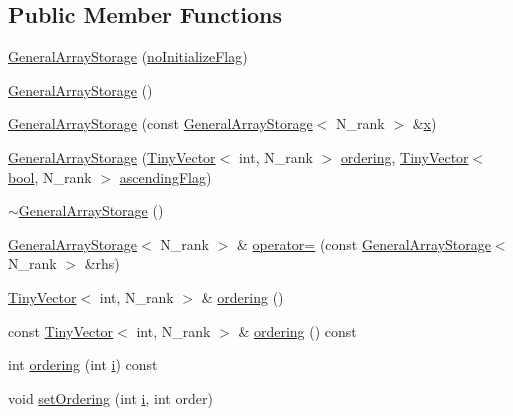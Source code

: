 \subsection*{Public Member Functions}
\begin{DoxyCompactItemize}
\item 
\hyperlink{classGeneralArrayStorage_ab02ffa50b97e3165e7accf59f1a40467}{General\+Array\+Storage} (\hyperlink{classGeneralArrayStorage_1_1noInitializeFlag}{no\+Initialize\+Flag})
\item 
\hyperlink{classGeneralArrayStorage_ad408f67d08d435c28089888711cf041b}{General\+Array\+Storage} ()
\item 
\hyperlink{classGeneralArrayStorage_a88e38a9f0858a5a22fbd696f4d643296}{General\+Array\+Storage} (const \hyperlink{classGeneralArrayStorage}{General\+Array\+Storage}$<$ N\+\_\+rank $>$ \&\hyperlink{vecnorm1_8cc_ac73eed9e41ec09d58f112f06c2d6cb63}{x})
\item 
\hyperlink{classGeneralArrayStorage_a8df71aed8a480968b90901e4c497d689}{General\+Array\+Storage} (\hyperlink{classTinyVector}{Tiny\+Vector}$<$ int, N\+\_\+rank $>$ \hyperlink{classGeneralArrayStorage_a09cd9534a9e0a2b1f6a5c5796b1c1489}{ordering}, \hyperlink{classTinyVector}{Tiny\+Vector}$<$ \hyperlink{compiler_8h_abb452686968e48b67397da5f97445f5b}{bool}, N\+\_\+rank $>$ \hyperlink{classGeneralArrayStorage_affa1b4235352c211cbbdb10c56e81b20}{ascending\+Flag})
\item 
\hyperlink{classGeneralArrayStorage_a150a4aef7b516c57a59b2d5760fec2d1}{$\sim$\+General\+Array\+Storage} ()
\item 
\hyperlink{classGeneralArrayStorage}{General\+Array\+Storage}$<$ N\+\_\+rank $>$ \& \hyperlink{classGeneralArrayStorage_a1e915a4bf940d0a558f8d99521a8be0e}{operator=} (const \hyperlink{classGeneralArrayStorage}{General\+Array\+Storage}$<$ N\+\_\+rank $>$ \&rhs)
\item 
\hyperlink{classTinyVector}{Tiny\+Vector}$<$ int, N\+\_\+rank $>$ \& \hyperlink{classGeneralArrayStorage_a09cd9534a9e0a2b1f6a5c5796b1c1489}{ordering} ()
\item 
const \hyperlink{classTinyVector}{Tiny\+Vector}$<$ int, N\+\_\+rank $>$ \& \hyperlink{classGeneralArrayStorage_a5be28c2445d6b117fe6a301921b0299a}{ordering} () const 
\item 
int \hyperlink{classGeneralArrayStorage_afe676b5c57d08fbc9407517e9017184a}{ordering} (int \hyperlink{indexexpr_8h_aabd77643995707c185e95c8cb2782c81}{i}) const 
\item 
void \hyperlink{classGeneralArrayStorage_ad958b1ee06e08a49f76e7e3df73a425b}{set\+Ordering} (int \hyperlink{indexexpr_8h_aabd77643995707c185e95c8cb2782c81}{i}, int order)

\end{DoxyCompactItemize}
